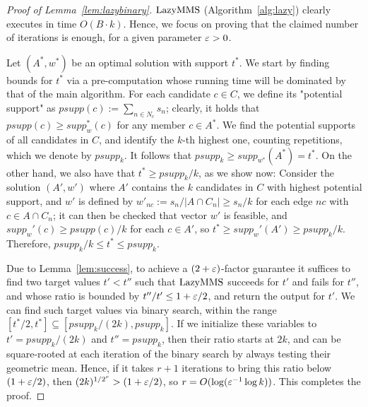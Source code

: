 \begin{proof}[Proof of Lemma~\ref{lem:lazybinary}]
$\operatorname{LazyMMS}$ (Algorithm~\ref{alg:lazy}) clearly executes in time $O(B\cdot k)$. Hence, we focus on proving that the claimed number of iterations is enough, for a given parameter $\varepsilon>0$.

Let $(A^*, w^*)$ be an optimal solution with support $t^*$. We start by finding bounds for $t^*$ via a pre-computation whose running time will be dominated by that of the main algorithm. For each candidate $c\in C$, we define its "potential support" as $psupp(c):=\sum_{n\in N_c} s_n$; clearly, it holds that $psupp(c)\geq supp_w^*(c)$ for any member $c\in A^*$. We find the potential supports of all candidates in $C$, and identify the $k$-th highest one, counting repetitions, which we denote by $psupp_k$. It follows that $psupp_k\geq supp_{w^*}(A^*)=t^*$. On the other hand, we also have that $t^* \geq psupp_k /k$, as we show now: Consider the solution $(A',w')$ where $A'$ contains the $k$ candidates in $C$ with highest potential support, and $w'$ is defined by $w'_{nc}:=s_n/|A\cap C_n| \geq s_n/k$ for each edge $nc$ with $c\in A\cap C_n$; it can then be checked that vector $w'$ is feasible, and $supp_w'(c)\geq psupp(c)/k$ for each $c\in A'$, so $t^*\geq supp_w'(A')\geq psupp_k/k$. Therefore, $psupp_k/k\leq t^*\leq psupp_k$.

Due to Lemma~\ref{lem:success}, to achieve a $(2+\varepsilon)$-factor guarantee it suffices to find two target values $t'<t''$ such that $\operatorname{LazyMMS}$ succeeds for $t'$ and fails for $t''$, and whose ratio is bounded by $t''/t'\leq 1+\varepsilon/2$, and return the output for $t'$. We can find such target values via binary search, within the range $[t^*/2, t^*]\subseteq [psupp_k/(2k), psupp_k]$. If we initialize these variables to $t'=psupp_k/(2k)$ and $t''=psupp_k$, then their ratio starts at $2k$, and can be square-rooted at each iteration of the binary search by always testing their geometric mean. Hence, if it takes $r+1$ iterations to bring this ratio below $(1+\varepsilon/2)$, then $(2k)^{1/2^r} > (1+\varepsilon/2)$, so $r=O(\log(\varepsilon^{-1}\log k))$. This completes the proof. 
\end{proof}

